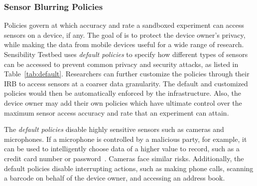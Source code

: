

\subsubsection{Sensor Blurring Policies}\label{sec-policy-design}

Policies govern at which accuracy and rate a sandboxed experiment can 
access sensors on a device, if any. 
The goal of \sysname is to protect the device owner's privacy, while making
the data from mobile devices useful for a wide range of research. 
Sensibility Testbed uses \textit{default policies} to specify how 
different types of sensors can be accessed to prevent common privacy and
security attacks, %
as listed in Table~\ref{tab:default}. 
Researchers can further customize the policies through their IRB
to access sensors at a coarser data granularity. The default and 
customized policies would then be automatically enforced by the \sysname 
infrastructure. 
Also, the device owner may add their own policies which have ultimate 
control over the maximum sensor access accuracy and rate that an 
experiment can attain.

The \textit{default policies} disable highly sensitive sensors 
such as cameras and microphones. 
If a microphone is controlled by a malicious party, for example, it can be used to 
intelligently choose data of a higher value to record, such as a credit card 
number or password~\cite{zhang2015leave}. Cameras face similar
risks. Additionally, the default policies disable interrupting actions, such as 
making phone calls, scanning a barcode on behalf of the device owner, 
and accessing an address book. 

